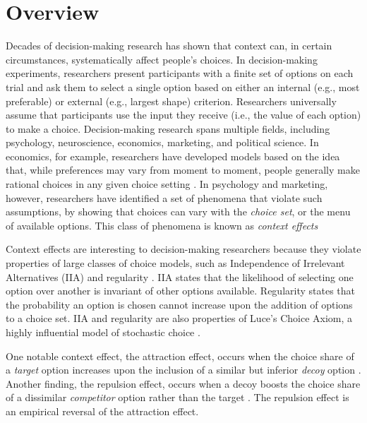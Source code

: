 \section{Overview}

Decades of decision-making research has shown that context can, in certain circumstances, systematically affect people's choices. In decision-making experiments, researchers present participants with a finite set of options on each trial and ask them to select a single option based on either an internal (e.g., most preferable) or external (e.g., largest shape) criterion. Researchers universally assume that participants use the input they receive (i.e., the value of each option) to make a choice. Decision-making research spans multiple fields, including psychology, neuroscience, economics, marketing, and political science. In economics, for example, researchers have developed models based on the idea that, while preferences may vary from moment to moment, people generally make rational choices in any given choice setting \parencite{mcfadden2001economic}. In psychology and marketing, however, researchers have identified a set of phenomena that violate such assumptions, by showing that choices can vary with the \textit{choice set}, or the menu of available options. This class of phenomena is known as \textit{context effects} 

Context effects are interesting to decision-making researchers because they violate properties of large classes of choice models, such as Independence of Irrelevant Alternatives (IIA) \parencite{ray1973independence} and regularity \parencite{mackay1995probabilistic,marley1989random}. IIA states that the likelihood of selecting one option over another is invariant of other options available. Regularity states that the probability an option is chosen cannot increase upon the addition of options to a choice set. IIA and regularity are also properties of Luce's Choice Axiom, a highly influential model of stochastic choice \parencite{luceChoiceAxiomTwenty1977a, luce1959individual}. 

One notable context effect, the attraction effect, occurs when the choice share of a \textit{target} option increases upon the inclusion of a similar but inferior \textit{decoy} option \parencite{huberAddingAsymmetricallyDominated1982d}. Another finding, the repulsion effect, occurs when a decoy boosts the choice share of a dissimilar \textit{competitor} option rather than the target \parencite{simonson2014vices}. The repulsion effect is an empirical reversal of the attraction effect. 


